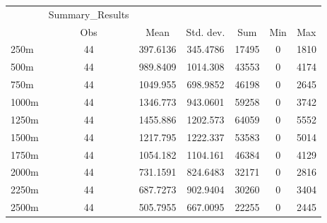 \begin{tabular}{l*{6}{c}}
\hline\hline
            &Summary\_Results&            &            &            &            &            \\
            &         Obs&        Mean&   Std. dev.&         Sum&         Min&         Max\\
\hline
250m        &          44&    397.6136&    345.4786&       17495&           0&        1810\\
500m        &          44&    989.8409&    1014.308&       43553&           0&        4174\\
750m        &          44&    1049.955&    698.9852&       46198&           0&        2645\\
1000m       &          44&    1346.773&    943.0601&       59258&           0&        3742\\
1250m       &          44&    1455.886&    1202.573&       64059&           0&        5552\\
1500m       &          44&    1217.795&    1222.337&       53583&           0&        5014\\
1750m       &          44&    1054.182&    1104.161&       46384&           0&        4129\\
2000m       &          44&    731.1591&    824.6483&       32171&           0&        2816\\
2250m       &          44&    687.7273&    902.9404&       30260&           0&        3404\\
2500m       &          44&    505.7955&    667.0095&       22255&           0&        2445\\
\hline\hline
\end{tabular}
